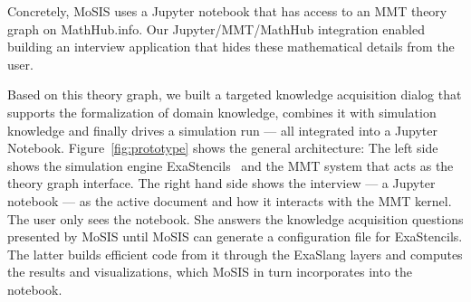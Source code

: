 Concretely, MoSIS uses a Jupyter notebook that has access to an MMT theory graph on MathHub.info.  Our Jupyter/MMT/MathHub integration enabled building an interview application that hides these mathematical details from the user.

Based on this theory graph, we built a targeted knowledge acquisition dialog that supports the formalization of domain knowledge, combines it with simulation knowledge and finally drives a simulation run --- all integrated into a Jupyter Notebook.
Figure~\ref{fig:prototype} shows the general architecture:
The left side shows the simulation engine \textsf{ExaStencils}~\cite{exastencils.on} and the MMT system that acts as the theory graph interface.
The right hand side shows the interview --- a Jupyter notebook --- as the active document and how it interacts with the MMT kernel.
The user only sees the notebook.
She answers the knowledge acquisition questions presented by MoSIS until MoSIS can generate a configuration file for ExaStencils.
The latter builds efficient code from it through the ExaSlang layers and computes the results and visualizations, which MoSIS in turn incorporates into the notebook. 


